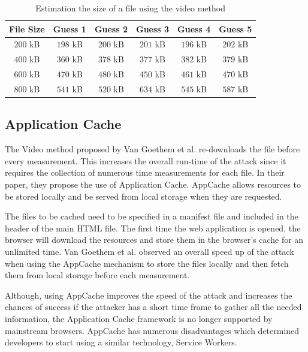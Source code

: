 \documentclass[10pt,a4paper,twoside]{book}
\begin{document}
\begin{table}[t]
\centering
\begin{tabular}{|c|c|c|c|c|c|}
\hline
\textbf{File Size} & \textbf{Guess 1} & \textbf{Guess 2} & \textbf{Guess 3} & \textbf{Guess 4} & \textbf{Guess 5} \\
\hline
$200$ kB & $198$ kB & $200$ kB & $201$ kB & $196$ kB & $202$ kB \\
\hline
$400$ kB & $360$ kB & $378$ kB & $377$ kB & $382$ kB & $379$ kB \\
\hline
$600$ kB & $470$ kB & $480$ kB & $450$ kB & $461$ kB & $470$ kB \\
\hline
$800$ kB & $541$ kB & $520$ kB & $634$ kB & $545$ kB & $587$ kB \\
\hline
\end{tabular}
\caption{Estimation the size of a file using the video method}
\label{tab:guessVideo}
\end{table}

\subsection{Application Cache}

The Video method proposed by Van Goethem et al. \cite{van2015clock} re-downloads the file before every measurement. This increases the overall run-time of the attack since it requires the collection of numerous time measurements for each file. In their paper, they propose the use of Application Cache. AppCache allows resources to be stored locally and be served from local storage when they are requested. 

The files to be cached need to be specified in a manifest file and included in the header of the main HTML file. The first time the web application is opened, the browser will download the resources and store them in the browser's cache for an unlimited time. Van Goethem et al. \cite{van2015clock} observed an overall speed up of the attack when using the AppCache mechanism to store the files locally and then fetch them from local storage before each measurement.

Although, using AppCache improves the speed of the attack and increases the chances of success if the attacker has a short time frame to gather all the needed information, the Application Cache framework is no longer supported by mainstream browsers. AppCache has numerous disadvantages which determined developers to start using a similar technology, Service Workers.

\end{document}
